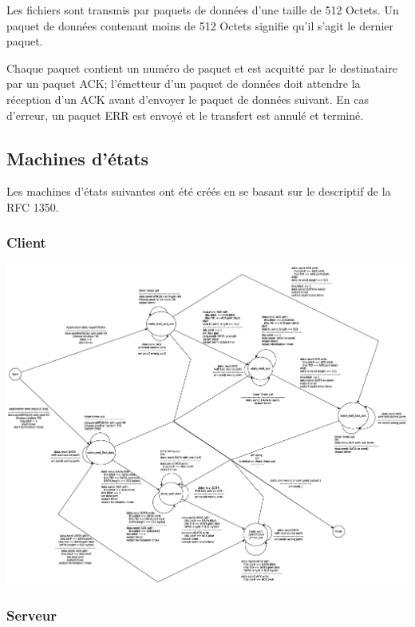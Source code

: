 \documentclass[11pt,a4paper]{article}
\begin{document}
  \par Les fichiers sont transmis par paquets de données d'une taille de 512 Octets. Un paquet de données contenant moins de 512 Octets signifie qu'il s'agit le dernier paquet.
  
  \par Chaque paquet contient un numéro de paquet et est acquitté par le destinataire par un paquet ACK; l'émetteur d'un paquet de données doit attendre la réception d'un ACK avant d'envoyer le paquet de données suivant.  En cas d'erreur, un paquet ERR est envoyé et le transfert est annulé et terminé. 
  
  \subsection{Machines d'états}

  \par Les machines d'états suivantes ont été créés en se basant sur le descriptif de la RFC 1350. 
  
  \subsubsection{Client}

  \begin{center}
	  \includegraphics[width=1\textwidth]{ressources/client_state-machine.eps}
  \end{center}
  
  \subsubsection{Serveur}
  
\end{document}
